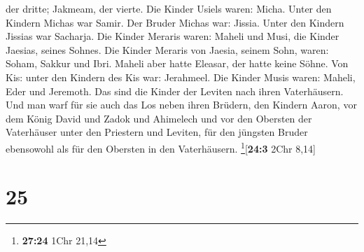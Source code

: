 der dritte; Jakmeam, der vierte.  Die Kinder Usiels
waren: Micha. Unter den Kindern Michas war Samir.  Der
Bruder Michas war: Jissia. Unter den Kindern Jissias war Sacharja.
 Die Kinder Meraris waren: Maheli und Musi, die Kinder
Jaesias, seines Sohnes.  Die Kinder Meraris von Jaesia,
seinem Sohn, waren: Soham, Sakkur und Ibri.  Maheli aber
hatte Eleasar, der hatte keine Söhne.  Von Kis: unter den
Kindern des Kis war: Jerahmeel.  Die Kinder Musis waren:
Maheli, Eder und Jeremoth. Das sind die Kinder der Leviten nach ihren
Vaterhäusern.  Und man warf für sie auch das Los neben
ihren Brüdern, den Kindern Aaron, vor dem König David und Zadok und
Ahimelech und vor den Obersten der Vaterhäuser unter den Priestern und
Leviten, für den jüngsten Bruder ebensowohl als für den Obersten in den
Vaterhäusern. \footnote{\textbf{27:24} 1Chr 21,14}{[}\textbf{24:3} 2Chr
8,14{]}

\hypertarget{section-24}{%
\section{25}\label{section-24}}

